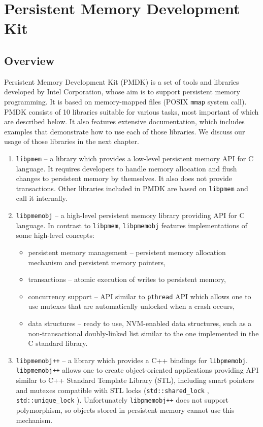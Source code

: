 \section{Persistent Memory Development Kit}

    \subsection{Overview}
        Persistent Memory Development Kit (PMDK) \cite{PmemIo} is a set of tools and libraries developed by Intel Corporation, whose aim is to support persistent memory programming. It is based on memory-mapped files (POSIX \texttt{mmap} system call). PMDK consists of 10 libraries suitable for various tasks, most important of which are described below. It also features extensive documentation, which includes examples that demonstrate how to use each of those libraries. We discuss our usage of those libraries in the next chapter.
        
    \begin{enumerate}
    
    \item
        \texttt{libpmem} -- a library which provides a low-level persistent memory API for C language. It requires developers to handle memory allocation and flush changes to persistent memory by themselves. It also does not provide transactions. Other libraries included in PMDK are based on \texttt{libpmem} and call it internally.
    
    \item
        \texttt{libpmemobj} -- a high-level persistent memory library providing API for C language. In contrast to \texttt{libpmem}, \texttt{libpmemobj} features implementations of some high-level concepts: 
        \begin{itemize}
            \item persistent memory management -- persistent memory allocation mechanism and persistent memory pointers,
            \item transactions -- atomic execution of writes to persistent memory,
            \item concurrency support -- API similar to \texttt{pthread} API which allows one to use mutexes that are automatically unlocked when a crash occurs,
            \item data structures -- ready to use, NVM-enabled data structures, such as a non-transactional doubly-linked list similar to the one implemented in the C standard library. 
        \end{itemize}
        
    \item
        \texttt{libpmemobj++} -- a library which provides a C++ bindings for \texttt{libpmemobj}. \texttt{libpmem\-obj++} allows one to create object-oriented applications providing API similar to C++ Standard Template Library (STL), including smart pointers and mutexes compatible with STL locks (\texttt{std::shared\_lock} \cite{SharedLock}, \texttt{std::unique\_lock} \cite{UniqueLock}).
        Unfortunately \texttt{libpmemobj++} does not support polymorphism, so objects stored in persistent memory cannot use this mechanism.
    \end{enumerate}
    
